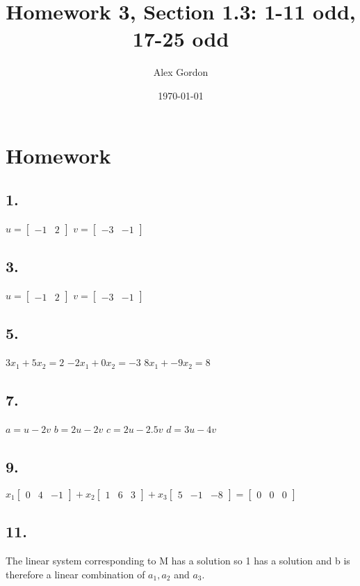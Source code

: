 \documentclass[12]{scrartcl}
\begin{document}
\title{Homework 3, Section 1.3: 1-11 odd, 17-25 odd}
\author{Alex Gordon}
\date{\today}
\maketitle
\section*{Homework}
\subsection*{1.}
$ u =  \begin{bmatrix} -1&2 \end{bmatrix} $
$ v =  \begin{bmatrix} -3&-1 \end{bmatrix} $
\subsection*{3.}
$ u =  \begin{bmatrix} -1&2 \end{bmatrix} $
$ v =  \begin{bmatrix} -3&-1 \end{bmatrix} $
\subsection*{5.}
$3x_1 + 5x_2 = 2$
$-2x_1 + 0x_2 = -3 $
$8x_1 + -9x_2 = 8 $
\subsection*{7.}
$a = u - 2v$
$b = 2u - 2v $
$c = 2u - 2.5v $
$d = 3u - 4v$
\subsection*{9.}
$ x_1 \begin{bmatrix} 0&4&-1 \end{bmatrix} + x_2 \begin{bmatrix} 1&6&3 \end{bmatrix} + x_3 \begin{bmatrix} 5&-1&-8 \end{bmatrix} = \begin{bmatrix} 0&0&0 \end{bmatrix}  $

\subsection*{11.}
The linear system corresponding to M has a solution so 1 has a solution and b is therefore a linear combination of $a_1, a_2$ and $a_3$.
\end{document}
